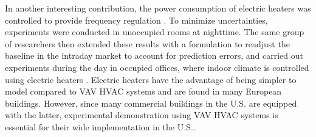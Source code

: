 \documentclass[../thesis.tex]{subfiles}
\begin{document}
In another interesting contribution, the power consumption of electric heaters was %
controlled to provide frequency regulation \cite{Fabietti:2016exp}. 
To minimize uncertainties, experiments were conducted in unoccupied rooms at nighttime.
The same group of researchers then extended these results with a formulation to readjust the baseline in the intraday market to account for prediction errors, and carried out experiments during the day in occupied offices, where indoor climate is controlled using electric heaters \cite{Gorecki:2017exp}.
Electric heaters have the advantage of being simpler to model compared to VAV HVAC systems and are found in many European buildings.
However, since many commercial buildings in the U.S. are equipped with the latter, experimental demonstration using VAV HVAC systems is essential for their wide implementation in the U.S..



\end{document}
